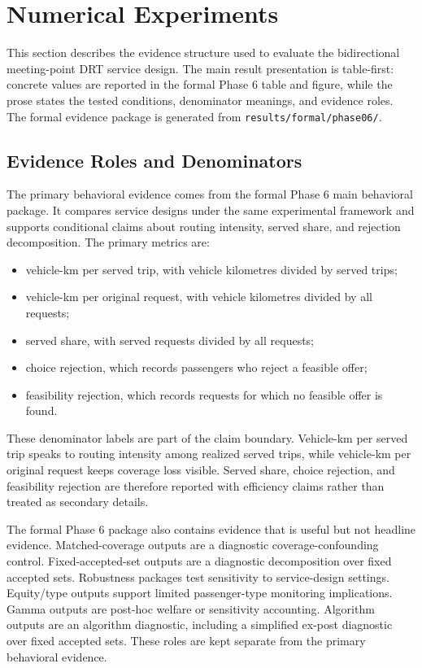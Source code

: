\section{Numerical Experiments}\label{sec:experiments}

This section describes the evidence structure used to evaluate the bidirectional
meeting-point DRT service design. The main result presentation is table-first: concrete
values are reported in the formal Phase 6 table and figure, while the prose states the
tested conditions, denominator meanings, and evidence roles. The formal evidence package
is generated from \texttt{results/formal/phase06/}.

\subsection{Evidence Roles and Denominators}

The primary behavioral evidence comes from the formal Phase 6 main behavioral package.
It compares service designs under the same experimental framework and supports
conditional claims about routing intensity, served share, and rejection decomposition.
The primary metrics are:
\begin{itemize}
  \item vehicle-km per served trip, with vehicle kilometres divided by served trips;
  \item vehicle-km per original request, with vehicle kilometres divided by all requests;
  \item served share, with served requests divided by all requests;
  \item choice rejection, which records passengers who reject a feasible offer;
  \item feasibility rejection, which records requests for which no feasible offer is found.
\end{itemize}
These denominator labels are part of the claim boundary. Vehicle-km per served trip
speaks to routing intensity among realized served trips, while vehicle-km per original
request keeps coverage loss visible. Served share, choice rejection, and feasibility
rejection are therefore reported with efficiency claims rather than treated as secondary
details.

The formal Phase 6 package also contains evidence that is useful but not headline
evidence. Matched-coverage outputs are a diagnostic coverage-confounding control.
Fixed-accepted-set outputs are a diagnostic decomposition over fixed accepted sets.
Robustness packages test sensitivity to service-design settings. Equity/type outputs
support limited passenger-type monitoring implications. Gamma outputs are post-hoc
welfare or sensitivity accounting. Algorithm outputs are an algorithm diagnostic,
including a simplified ex-post diagnostic over fixed accepted sets. These roles are
kept separate from the primary behavioral evidence.

